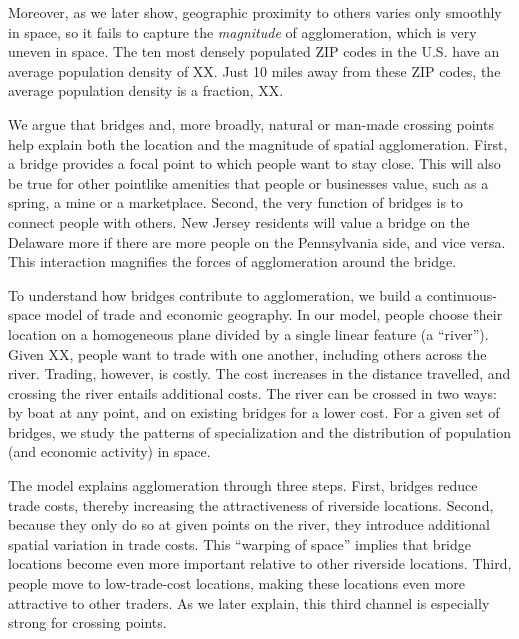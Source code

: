 \documentclass[12pt]{article}
\begin{document}
Moreover, as we later show, geographic proximity to others varies only smoothly in space, so it fails to capture the \emph{magnitude} of agglomeration, which is very uneven in space. The ten most densely populated ZIP codes in the U.S. have an average population density of XX. Just 10 miles away from these ZIP codes, the average population density is a fraction, XX.

We argue that bridges and, more broadly, natural or man-made crossing points help explain both the location and the magnitude of spatial agglomeration. First, a bridge provides a focal point to which people want to stay close. This will also be true for other pointlike amenities that people or businesses value, such as a spring, a mine or a marketplace. Second, the very function of bridges is to connect people with others. New Jersey residents will value a bridge on the Delaware more if there are more people on the Pennsylvania side, and vice versa. This interaction magnifies the forces of agglomeration around the bridge.


To understand how bridges contribute to agglomeration, we build a continuous-space model of trade and economic geography. In our model, people choose their location on a homogeneous plane divided by
a single linear feature (a \textquotedblleft river\textquotedblright ). Given XX, people want to trade with one another, including others across the river. Trading, however, is costly. The cost
increases in the distance travelled, and crossing the river entails
additional costs. The river can be crossed in two ways: by boat at any
point, and on existing bridges for a lower cost. For a given set of bridges,
we study the patterns of specialization and the distribution of population
(and economic activity) in space.

The model explains agglomeration through three steps. First, bridges reduce trade costs, thereby increasing the attractiveness of riverside locations. Second, because they only do so at given points on the river, they introduce additional spatial variation in trade costs. This ``warping of space'' implies that bridge locations become even more important relative to other riverside locations. Third, people move to low-trade-cost locations, making these locations even more attractive to other traders. As we later explain, this third channel is especially strong for crossing points.
\end{document}
